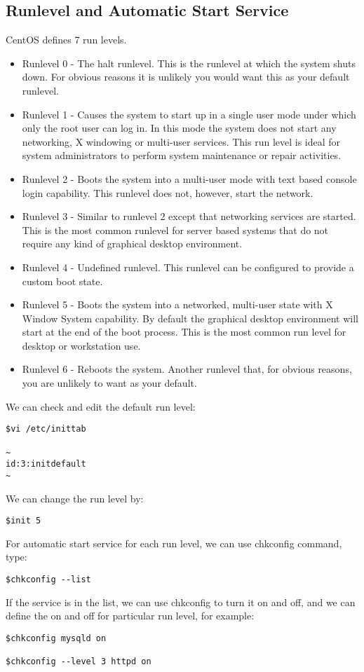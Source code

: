 \documentclass{article}
\begin{document}
\subsection{Runlevel and Automatic Start Service}
CentOS defines 7 run levels. 
\begin{itemize}
    \item
    Runlevel 0 - The halt runlevel. This is the runlevel at which the system shuts down. For obvious reasons it is unlikely you would want this as your default runlevel. 
    \item
    Runlevel 1 - Causes the system to start up in a single user mode under which only the root user can log in. In this mode the system does not start any networking, X windowing or multi-user services. This run level is ideal for system administrators to perform system maintenance or repair activities. 
    \item
    Runlevel 2 - Boots the system into a multi-user mode with text based console login capability. This runlevel does not, however, start the network. 
    \item
    Runlevel 3 - Similar to runlevel 2 except that networking services are started. This is the most common runlevel for server based systems that do not require any kind of graphical desktop environment. 
    \item
    Runlevel 4 - Undefined runlevel. This runlevel can be configured to provide a custom boot state. 
    \item
    Runlevel 5 - Boots the system into a networked, multi-user state with X Window System capability. By default the graphical desktop environment will start at the end of the boot process. This is the most common run level for desktop or workstation use. 
    \item
    Runlevel 6 - Reboots the system. Another runlevel that, for obvious reasons, you are unlikely to want as your default. 
\end{itemize}
We can check and edit the default run level:
\begin{lstlisting}
$vi /etc/inittab

~
id:3:initdefault
~
\end{lstlisting}
We can change the run level by:
\begin{lstlisting}
$init 5
\end{lstlisting}
For automatic start service for each run level, we can use chkconfig command, type:
\begin{lstlisting}
$chkconfig --list
\end{lstlisting}
If the service is in the list, we can use chkconfig to turn it on and off, and we can define the on and off for particular run level, for example:
\begin{lstlisting}
$chkconfig mysqld on

$chkconfig --level 3 httpd on
\end{lstlisting}
\end{document}
